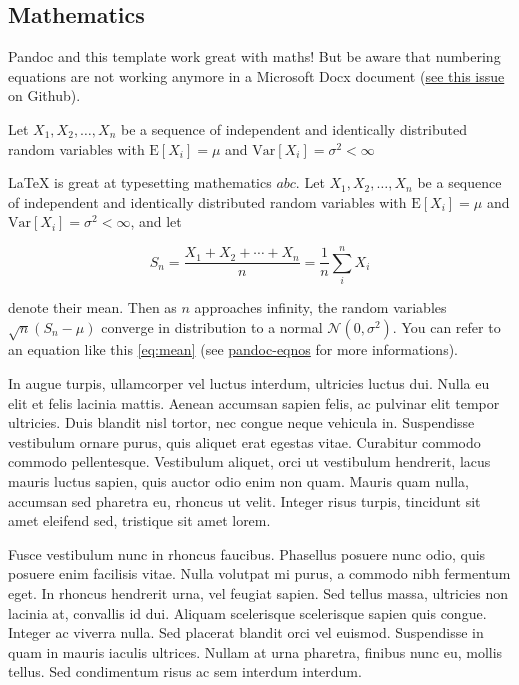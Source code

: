 \documentclass[9pt,biorxiv,doublespacing,lineno]{lapreprint}
\begin{document}
\hypertarget{mathematics}{%
\subsection{Mathematics}\label{mathematics}}

Pandoc and this template work great with maths! But be aware that
numbering equations are not working anymore in a Microsoft Docx document
(\href{https://github.com/tomduck/pandoc-eqnos/pull/64}{see this issue}
on Github).

Let \(X_1, X_2, \ldots, X_n\) be a sequence of independent and
identically distributed random variables with \(\text{E}[X_i] = \mu\)
and \(\text{Var}[X_i] = \sigma^2 < \infty\)

\LaTeX{} is great at typesetting mathematics \(abc\). Let
\(X_1, X_2, \ldots, X_n\) be a sequence of independent and identically
distributed random variables with \(\text{E}[X_i] = \mu\) and
\(\text{Var}[X_i] = \sigma^2 < \infty\), and let

\begin{equation}
S_n = \frac{X_1 + X_2 + \cdots + X_n}{n}
    = \frac{1}{n}\sum_{i}^{n} X_i
\label{eq:mean}\end{equation}

denote their mean. Then as \(n\) approaches infinity, the random
variables \(\sqrt{n}(S_n - \mu)\) converge in distribution to a normal
\(\mathcal{N}(0, \sigma^2)\). You can refer to an equation like this
\cref{eq:mean} (see
\href{https://github.com/tomduck/pandoc-eqnos\#markdown-syntax}{pandoc-eqnos}
for more informations).

In augue turpis, ullamcorper vel luctus interdum, ultricies luctus dui.
Nulla eu elit et felis lacinia mattis. Aenean accumsan sapien felis, ac
pulvinar elit tempor ultricies. Duis blandit nisl tortor, nec congue
neque vehicula in. Suspendisse vestibulum ornare purus, quis aliquet
erat egestas vitae. Curabitur commodo commodo pellentesque. Vestibulum
aliquet, orci ut vestibulum hendrerit, lacus mauris luctus sapien, quis
auctor odio enim non quam. Mauris quam nulla, accumsan sed pharetra eu,
rhoncus ut velit. Integer risus turpis, tincidunt sit amet eleifend sed,
tristique sit amet lorem.

Fusce vestibulum nunc in rhoncus faucibus. Phasellus posuere nunc odio,
quis posuere enim facilisis vitae. Nulla volutpat mi purus, a commodo
nibh fermentum eget. In rhoncus hendrerit urna, vel feugiat sapien. Sed
tellus massa, ultricies non lacinia at, convallis id dui. Aliquam
scelerisque scelerisque sapien quis congue. Integer ac viverra nulla.
Sed placerat blandit orci vel euismod. Suspendisse in quam in mauris
iaculis ultrices. Nullam at urna pharetra, finibus nunc eu, mollis
tellus. Sed condimentum risus ac sem interdum interdum.
\end{document}
